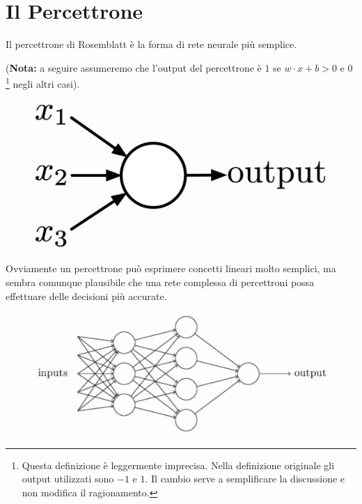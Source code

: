 \section{Il Percettrone}
Il percettrone di Rosemblatt è la forma di rete neurale più semplice. 



(\textbf{Nota:} a seguire assumeremo che l’output del percettrone è $1$ se $w\cdot x+b>0$ e $0$\footnote{Questa definizione è leggermente imprecisa. Nella definizione originale gli output utilizzati sono $-1$ e $1$. Il cambio serve a semplificare la discussione e non modifica il ragionamento.} negli altri casi).
\begin{figure}[!h]
    \includegraphics[scale=.4]{images/gradient_descent/perceptron.png}
    \centering
\end{figure}




Ovviamente un percettrone può esprimere concetti lineari molto semplici, ma sembra comunque plausibile che una rete complessa di percettroni possa effettuare delle decisioni più accurate. 
\begin{figure}[!h]
    \includegraphics[scale=.4]{images/gradient_descent/perc_net.png}
    \centering
\end{figure}



